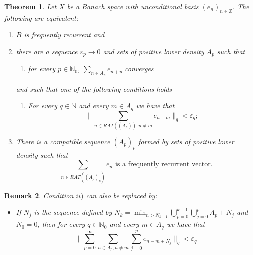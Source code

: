 \documentclass[11pt]{amsart}
\newtheorem{theorem}{Theorem}[section]
\newtheorem{remark}[theorem]{Remark}
\newcommand{\zN}{\mathbb N}
\begin{document}
\begin{theorem}\label{Characterization frequent recurrence bil}
Let $X$ be a Banach space with unconditional basis $(e_n)_{n\in\mathbb Z}$. The following are equivalent: 
\begin{enumerate}
\item $B$ is frequently recurrent and
\item
 there are a sequence $\varepsilon_p\to 0$ and sets of positive lower density $A_p$ such that
\begin{enumerate}
    \item [i)]for every $p\in\mathbb N_0$, $\sum_{n\in A_p}e_{n+p}$ converges 
\end{enumerate}
and such that one of the following conditions holds
\begin{enumerate}
    
    \item [ii)]For every $q\in \zN$ and every $m\in A_q$ we have that
    $$\Big\|\sum_{n\in RAT((A_p)), n\neq m} e_{n-m}\Big\|_q<\varepsilon_q;$$
    
    
\end{enumerate}
\item There is a compatible sequence $(A_p)_p$ formed by sets of positive lower density such that
$$\sum_{n\in RAT((A_p)_p)} e_n \text{ is a frequently recurrent vector}.$$
\end{enumerate}

\end{theorem}
\begin{remark}\label{rem: condition ii' bil}
Condition $ii)$ can also  be replaced by:
    \begin{itemize}
    \item [ii')]
     If $N_j$ is the sequence defined by $N_k=\min_{n>{N_{k-1}}} \bigcup_{p=0}^{k-1} \bigcup_{j=0}^p A_p+N_j$ and $N_0=0$, then 
    for every $q\in\mathbb N_0$ and every  $m\in A_q$ we have that
    $$\|\sum_{p=0}^\infty \sum_{n\in A_p, n\neq m} \sum_{j=0}^p e_{n-m+N_j}\|_q<\varepsilon_q$$
    
    \end{itemize}
    
\end{remark}
\end{document}
